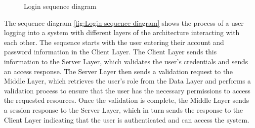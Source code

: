     \begin{figure}[!ht]
        \centering
        \caption{Login sequence diagram}
        \label{fig:Login sequence diagram}
    \end{figure}
    
The sequence diagram \autoref{fig:Login sequence diagram} shows the process of a user logging into a system with different layers of the architecture interacting with each other. The sequence starts with the user entering their account and password information in the Client Layer. The Client Layer sends this information to the Server Layer, which validates the user's credentials and sends an access response. The Server Layer then sends a validation request to the Middle Layer, which retrieves the user's role from the Data Layer and performs a validation process to ensure that the user has the necessary permissions to access the requested resources. Once the validation is complete, the Middle Layer sends a session response to the Server Layer, which in turn sends the response to the Client Layer indicating that the user is authenticated and can access the system.


